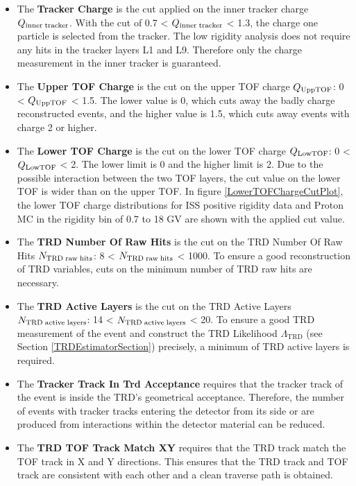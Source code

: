 \begin{itemize}
\item The \textbf{Tracker Charge} is the cut applied on the inner tracker charge $Q_{\rm{inner\; tracker}}$. With the cut of 0.7 < $Q_{\rm{inner\; tracker}}$ < 1.3, the charge one particle is selected from the tracker. The low rigidity analysis does not require any hits in the tracker layers L1 and L9. Therefore only the charge measurement in the inner tracker is guaranteed.   

\item The \textbf{Upper TOF Charge} is the cut on the upper TOF charge $Q_{\rm{UppTOF}}$: 0 < $Q_{\rm{UppTOF}}$ < 1.5. The lower value is 0, which cuts away the badly charge reconstructed events, and the higher value is 1.5, which cuts away events with charge 2 or higher.

\item The \textbf{Lower TOF Charge} is the cut on the lower TOF charge $Q_{\rm{LowTOF}}$: 0 < $Q_{\rm{LowTOF}}$ < 2. The lower limit is 0 and the higher limit is 2. Due to the possible interaction between the two TOF layers, the cut value on the lower TOF is wider than on the upper TOF. In figure \ref{LowerTOFChargeCutPlot}, the lower TOF charge distributions for ISS positive rigidity data and Proton MC in the rigidity bin of 0.7 to 18 GV are shown with the applied cut value. 

\item The \textbf{TRD Number Of Raw Hits} is the cut on the TRD Number Of Raw Hits $N_{\rm{TRD\;raw\;hits}}$: 8 < $N_{\rm{TRD\;raw\;hits}}$ < 1000. To ensure a good reconstruction of TRD variables, cuts on the minimum number of TRD raw hits are necessary. 

\item The \textbf{TRD Active Layers} is the cut on the TRD Active Layers $N_{\rm{TRD\;active\;layers}}$: 14 < $N_{\rm{TRD\;active\;layers}}$ < 20. To ensure a good TRD measurement of the event and construct the TRD Likelihood $\Lambda_\mathrm{TRD}$ (see Section \ref{TRDEstimatorSection}) precisely, a minimum of TRD active layers is required.    

\item The \textbf{Tracker Track In Trd Acceptance} requires that the tracker track of the event is inside the TRD's geometrical acceptance. Therefore, the number of events with tracker tracks entering the detector from its side or are produced from interactions within the detector material can be reduced. 

\item The \textbf{TRD TOF Track Match XY} requires that the TRD track match the TOF track in X and Y directions. This ensures that the TRD track and TOF track are consistent with each other and a clean traverse path is obtained.

\end{itemize}


